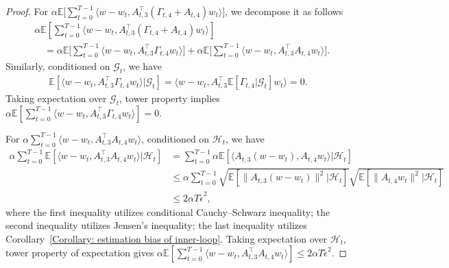 \documentclass[twoside]{article} %
\theoremstyle{plain}
\theoremstyle{definition}
\theoremstyle{remark}
\newcommand{\tepsilon}{\tilde{\epsilon}}
\newcommand{\calG}{\mathcal{G}}
\newcommand{\calH}{\mathcal{H}}
\begin{document}
\begin{proof}
For $\alpha \mathbb{E}\big[\sum_{t=0}^{T-1}\langle w-w_t, A_{t,3}^{\top} (\Gamma_{t,4}+A_{t,4}) w_t \rangle \big]$, we decompose it as follows
\begin{align}
    &\alpha \mathbb{E}[\sum_{t=0}^{T-1}\langle w-w_t, A_{t,3}^{\top} (\Gamma_{t,4}+A_{t,4}) w_t \rangle] \nonumber\\
    &\quad = \alpha \mathbb{E}\big[\sum_{t=0}^{T-1}\langle w-w_t, A_{t,3}^{\top} \Gamma_{t,4} w_t \rangle\big] + \alpha \mathbb{E}\big[\sum_{t=0}^{T-1}\langle w-w_t, A_{t,3}^{\top}A_{t,4}w_t \rangle \big]. \nonumber
\end{align}
Similarly, conditioned on $\calG_t$, we have 
\begin{align}
    \mathbb{E}[\langle w-w_t, A_{t,3}^{\top}\Gamma_{t,4} w_t \rangle |\calG_t] = \langle w-w_t, A_{t,3}^{\top}\mathbb{E}[\Gamma_{t,4}|\calG_t] w_t \rangle = 0.
    \label{eq: inner product bound 4}
\end{align}
Taking expectation over $\calG_t$, tower property implies $ \alpha \mathbb{E}[\sum_{t=0}^{T-1}\langle w-w_t, A_{t,3}^{\top} \Gamma_{t,4} w_t \rangle] = 0$.

For $\alpha \sum_{t=0}^{T-1}\langle w-w_t, A_{t,3}^{\top} A_{t,4} w_t \rangle$, conditioned on $\calH_t$, we have
\begin{align}
    \alpha\sum_{t=0}^{T-1}  \mathbb{E}[\langle w-w_t, A_{t,3}^{\top} A_{t,4} w_t \rangle|\calH_t] &= \sum_{t=0}^{T-1} \alpha \mathbb{E}[\langle A_{t,3}(w-w_t), A_{t,4} w_t \rangle|\calH_t] \nonumber\\
    &\leq \alpha \sum_{t=0}^{T-1}\sqrt{\mathbb{E}[\|A_{t,3}(w-w_t)\|^2|\calH_t]}\sqrt{\mathbb{E}[\|A_{t,4}w_t\|^2|\calH_t]}\nonumber\\
    &\leq  2\alpha T \tepsilon^2,
    \label{eq: inner product bound 5}
\end{align}
where the first inequality utilizes conditional Cauchy–Schwarz inequality; the second inequality utilizes Jensen's inequality; the last inequality utilizes Corollary~\ref{Corollary: estimation bias of inner-loop}. Taking expectation over $\calH_t$, tower property of expectation gives $\alpha \mathbb{E}[\sum_{t=0}^{T-1}\langle w-w_t, A_{t,3}^{\top} A_{t,4} w_t \rangle]\leq 2\alpha T\tepsilon^2$.



\end{proof}
\end{document}
